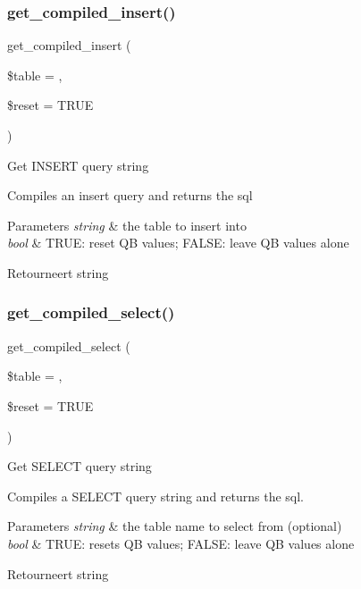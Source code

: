 \subsubsection{\texorpdfstring{get\_compiled\_insert()}{get\_compiled\_insert()}}
{\footnotesize\ttfamily get\+\_\+compiled\+\_\+insert (\begin{DoxyParamCaption}\item[{}]{\$table = {\ttfamily \textquotesingle{}\textquotesingle{}},  }\item[{}]{\$reset = {\ttfamily TRUE} }\end{DoxyParamCaption})}

Get I\+N\+S\+E\+RT query string

Compiles an insert query and returns the sql


\begin{DoxyParams}{Parameters}
{\em string} & the table to insert into \\
\hline
{\em bool} & T\+R\+UE\+: reset QB values; F\+A\+L\+SE\+: leave QB values alone \\
\hline
\end{DoxyParams}
\begin{DoxyReturn}{Retourneert}
string 
\end{DoxyReturn}
\mbox{\label{class_c_i___d_b__query__builder_a23325dd8908b76e716e430b4968e3987}} 
\subsubsection{\texorpdfstring{get\_compiled\_select()}{get\_compiled\_select()}}
{\footnotesize\ttfamily get\+\_\+compiled\+\_\+select (\begin{DoxyParamCaption}\item[{}]{\$table = {\ttfamily \textquotesingle{}\textquotesingle{}},  }\item[{}]{\$reset = {\ttfamily TRUE} }\end{DoxyParamCaption})}

Get S\+E\+L\+E\+CT query string

Compiles a S\+E\+L\+E\+CT query string and returns the sql.


\begin{DoxyParams}{Parameters}
{\em string} & the table name to select from (optional) \\
\hline
{\em bool} & T\+R\+UE\+: resets QB values; F\+A\+L\+SE\+: leave QB values alone \\
\hline
\end{DoxyParams}
\begin{DoxyReturn}{Retourneert}
string 
\end{DoxyReturn}
\mbox{\label{class_c_i___d_b__query__builder_a77fb150224714405067df7c300c317b0}} 
